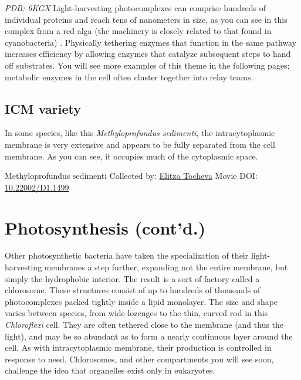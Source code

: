 \documentclass[]{tufte-book}
\begin{document}
\emph{PDB: 6KGX}
Light-harvesting photocomplexes can comprise hundreds of individual proteins and reach tens of nanometers in size, as you can see in this complex from a red alga (the machinery is closely related to that found in cyanobacteria) \citep{ma2020}. Physically tethering enzymes that function in the same pathway increases efficiency by allowing enzymes that catalyze subsequent steps to hand off substrates. You will see more examples of this theme in the following pages; metabolic enzymes in the cell often cluster together into relay teams.

\hypertarget{ICM_variety}{%
\subsection{ICM variety}\label{ICM_variety}}

In some species, like this \emph{Methyloprofundus sedimenti}, the intracytoplasmic membrane is very extensive and appears to be fully separated from the cell membrane. As you can see, it occupies much of the cytoplasmic space.



\hypertarget{htmlwidget-d14d4dc15b3419161115}{}

\label{fig:4-3a}Methyloprofundus sedimenti Collected by: \protect\hyperlink{elitza_tocheva}{Elitza Tocheva} Movie DOI: \href{https://doi.org/10.22002/D1.1499}{10.22002/D1.1499}

\hypertarget{photosynthesis-contd.}{%
\section{Photosynthesis (cont'd.)}\label{photosynthesis-contd.}}

Other photosynthetic bacteria have taken the specialization of their light-harvesting membranes a step further, expanding not the entire membrane, but simply the hydrophobic interior. The result is a sort of factory called a chlorosome. These structures consist of up to hundreds of thousands of photocomplexes packed tightly inside a lipid monolayer. The size and shape varies between species, from wide lozenges to the thin, curved rod in this \emph{Chloroflexi} cell. They are often tethered close to the membrane (and thus the light), and may be so abundant as to form a nearly continuous layer around the cell. As with intracytoplasmic membrane, their production is controlled in response to need. Chlorosomes, and other compartments you will see soon, challenge the idea that organelles exist only in eukaryotes.
\end{document}

